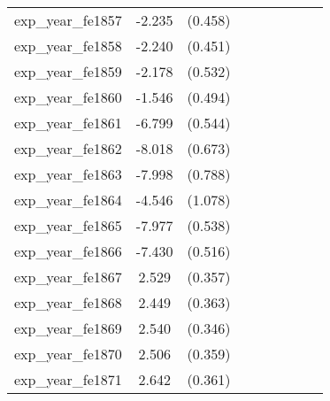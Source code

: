 {\begin{tabular}{l*{4}{cc}}
exp\_year\_fe1857&   -2.235\sym{***}&  (0.458)&                  &         &                  &         &                  &         \\
exp\_year\_fe1858&   -2.240\sym{***}&  (0.451)&                  &         &                  &         &                  &         \\
exp\_year\_fe1859&   -2.178\sym{***}&  (0.532)&                  &         &                  &         &                  &         \\
exp\_year\_fe1860&   -1.546\sym{**} &  (0.494)&                  &         &                  &         &                  &         \\
exp\_year\_fe1861&   -6.799\sym{***}&  (0.544)&                  &         &                  &         &                  &         \\
exp\_year\_fe1862&   -8.018\sym{***}&  (0.673)&                  &         &                  &         &                  &         \\
exp\_year\_fe1863&   -7.998\sym{***}&  (0.788)&                  &         &                  &         &                  &         \\
exp\_year\_fe1864&   -4.546\sym{***}&  (1.078)&                  &         &                  &         &                  &         \\
exp\_year\_fe1865&   -7.977\sym{***}&  (0.538)&                  &         &                  &         &                  &         \\
exp\_year\_fe1866&   -7.430\sym{***}&  (0.516)&                  &         &                  &         &                  &         \\
exp\_year\_fe1867&    2.529\sym{***}&  (0.357)&                  &         &                  &         &                  &         \\
exp\_year\_fe1868&    2.449\sym{***}&  (0.363)&                  &         &                  &         &                  &         \\
exp\_year\_fe1869&    2.540\sym{***}&  (0.346)&                  &         &                  &         &                  &         \\
exp\_year\_fe1870&    2.506\sym{***}&  (0.359)&                  &         &                  &         &                  &         \\
exp\_year\_fe1871&    2.642\sym{***}&  (0.361)&                  &         &                  &         &                  &         \\

\end{tabular}}
